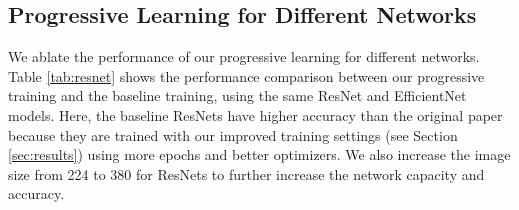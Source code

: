 \documentclass{article}
\begin{document}
\begin{table}[h]
    \vskip -0.15in
    \centering
    \caption{
    Scaling down model size -- We measure the inference throughput on V100 FP16 GPU with batch size 128.}
    \vskip -0.1in
\label{tab:v1v2compare}
\end{table} 
\subsection{Progressive Learning for Different Networks}
We ablate the performance of our progressive learning for different networks. Table \ref{tab:resnet} shows the performance comparison between our progressive training and the baseline training,  using the same ResNet and EfficientNet models.  Here, the baseline ResNets have higher accuracy than the original paper~\cite{resnet16} because they are trained with our improved training settings (see Section \ref{sec:results}) using more epochs and better optimizers. We also increase the image size from 224 to 380 for ResNets to further increase the network capacity and accuracy. 
\end{document}
